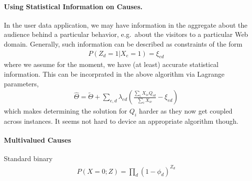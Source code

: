 \documentclass{article}
\begin{document}
\paragraph{Using Statistical Information on Causes.} In the user data application, we may have information in the aggregate about the audience behind a particular behavior, e.g.~about the visitors to a particular Web domain. Generally, such information can be described as constraints of the form 
\begin{align}
P(Z_d=1| X_e=1) = \xi_{ed} 
\end{align}
where we assume for the moment, we have (at least) accurate statistical information. This can be incorprated in the above algorithm via Lagrange parameters, 
\begin{align}
\hat \Theta = \tilde \Theta +  \sum_{e,d} \lambda_{ed} \left( \frac{\sum_i X_{ie} Q_{id}}{\sum_i X_{ie}} - \xi_{ed} \right) 
\end{align}
which makes determining the solution for $Q_i$ harder as they now get coupled across instances. It seems not hard to device an appropriate algorithm though. 

\paragraph{Multivalued Causes}

Standard binary 
\begin{align}
P(X=0; Z) = \prod_{d} (1-\phi_d)^{Z_d} 
\end{align}





\end{document}
